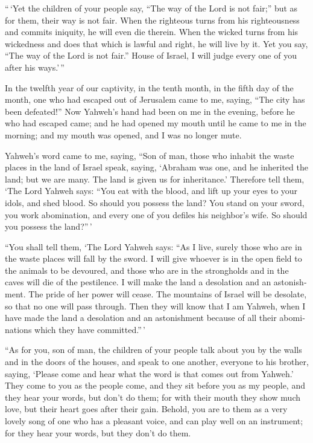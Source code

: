 \begin{paracol}{2}
\begin{otherlanguage}{english}
 ``\,`Yet the children of your people say, ``The way of
the Lord is not fair;'' but as for them, their way is not fair.
 When the righteous turns from his righteousness and
commits iniquity, he will even die therein.  When the
wicked turns from his wickedness and does that which is lawful and
right, he will live by it.  Yet you say, ``The way of the
Lord is not fair.'' House of Israel, I will judge every one of you after
his ways.'\,''

 In the twelfth year of our captivity, in the tenth
month, in the fifth day of the month, one who had escaped out of
Jerusalem came to me, saying, ``The city has been defeated!''
 Now Yahweh's hand had been on me in the evening, before
he who had escaped came; and he had opened my mouth until he came to me
in the morning; and my mouth was opened, and I was no longer mute.

 Yahweh's word came to me, saying,  ``Son
of man, those who inhabit the waste places in the land of Israel speak,
saying, `Abraham was one, and he inherited the land; but we are many.
The land is given us for inheritance.'  Therefore tell
them, `The Lord Yahweh says: ``You eat with the blood, and lift up your
eyes to your idols, and shed blood. So should you possess the land?
 You stand on your sword, you work abomination, and every
one of you defiles his neighbor's wife. So should you possess the
land?''\,'

 ``You shall tell them, `The Lord Yahweh says: ``As I
live, surely those who are in the waste places will fall by the sword. I
will give whoever is in the open field to the animals to be devoured,
and those who are in the strongholds and in the caves will die of the
pestilence.  I will make the land a desolation and an
astonishment. The pride of her power will cease. The mountains of Israel
will be desolate, so that no one will pass through.  Then
they will know that I am Yahweh, when I have made the land a desolation
and an astonishment because of all their abominations which they have
committed.''\,'

 ``As for you, son of man, the children of your people
talk about you by the walls and in the doors of the houses, and speak to
one another, everyone to his brother, saying, `Please come and hear what
the word is that comes out from Yahweh.'  They come to
you as the people come, and they sit before you as my people, and they
hear your words, but don't do them; for with their mouth they show much
love, but their heart goes after their gain.  Behold, you
are to them as a very lovely song of one who has a pleasant voice, and
can play well on an instrument; for they hear your words, but they don't
do them.


\end{otherlanguage}
\end{paracol}
